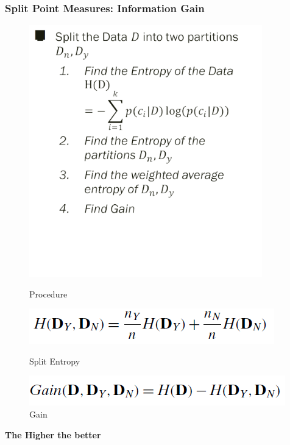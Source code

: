\begin{itemize}
    \subsubsection{Split Point Measures: Information Gain}
        \begin{figure}[H]
            \centering
            \begin{minipage}{0.6\textwidth}
                \centering
                \includegraphics[width=0.9\textwidth]{Figures/dt2.png} %
                \caption{Procedure}
            \end{minipage}\hfill
            \begin{minipage}{0.4\textwidth}
                \centering
                \includegraphics[width=\textwidth]{Figures/dt3.png} %
                \caption{Split Entropy}
            \end{minipage}
            \begin{minipage}{0.4\textwidth}
                \centering
                \includegraphics[width=\textwidth]{Figures/dt4.png} %
                \caption{Gain}
            \end{minipage}
        \end{figure}
        \textbf{The Higher the better}

\end{itemize}

